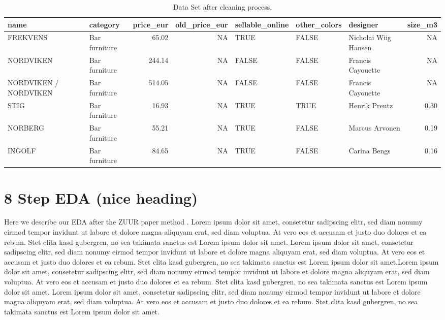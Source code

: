 \documentclass[a4paper, nobind]{templates/ociamthesis}
\begin{document}
\begin{table}

\caption{\label{tab:tidy-ikea}Data Set after cleaning process.}
\centering
\begin{tabular}[t]{l|l|r|r|l|l|l|r}
\hline
name & category & price\_eur & old\_price\_eur & sellable\_online & other\_colors & designer & size\_m3\\
\hline
FREKVENS & Bar furniture & 65.02 & NA & TRUE & FALSE & Nicholai Wiig Hansen & NA\\
\hline
NORDVIKEN & Bar furniture & 244.14 & NA & FALSE & FALSE & Francis Cayouette & NA\\
\hline
NORDVIKEN / NORDVIKEN & Bar furniture & 514.05 & NA & FALSE & FALSE & Francis Cayouette & NA\\
\hline
STIG & Bar furniture & 16.93 & NA & TRUE & TRUE & Henrik Preutz & 0.30\\
\hline
NORBERG & Bar furniture & 55.21 & NA & TRUE & FALSE & Marcus Arvonen & 0.19\\
\hline
INGOLF & Bar furniture & 84.65 & NA & TRUE & FALSE & Carina Bengs & 0.16\\
\hline
\end{tabular}
\end{table}

\hypertarget{tbd}{%
\section{8 Step EDA (nice heading)}\label{tbd}}

Here we describe our EDA after the ZUUR paper method \autocite[pp.~33-35]{von_goethe_wilhelm_1829}.
Lorem ipsum dolor sit amet, consetetur sadipscing elitr, sed diam nonumy eirmod tempor invidunt ut labore et dolore magna aliquyam erat, sed diam voluptua. At vero eos et accusam et justo duo dolores et ea rebum. Stet clita kasd gubergren, no sea takimata sanctus est Lorem ipsum dolor sit amet. Lorem ipsum dolor sit amet, consetetur sadipscing elitr, sed diam nonumy eirmod tempor invidunt ut labore et dolore magna aliquyam erat, sed diam voluptua. At vero eos et accusam et justo duo dolores et ea rebum. Stet clita kasd gubergren, no sea takimata sanctus est Lorem ipsum dolor sit amet.Lorem ipsum dolor sit amet, consetetur sadipscing elitr, sed diam nonumy eirmod tempor invidunt ut labore et dolore magna aliquyam erat, sed diam voluptua. At vero eos et accusam et justo duo dolores et ea rebum. Stet clita kasd gubergren, no sea takimata sanctus est Lorem ipsum dolor sit amet. Lorem ipsum dolor sit amet, consetetur sadipscing elitr, sed diam nonumy eirmod tempor invidunt ut labore et dolore magna aliquyam erat, sed diam voluptua. At vero eos et accusam et justo duo dolores et ea rebum. Stet clita kasd gubergren, no sea takimata sanctus est Lorem ipsum dolor sit amet.
\end{document}
